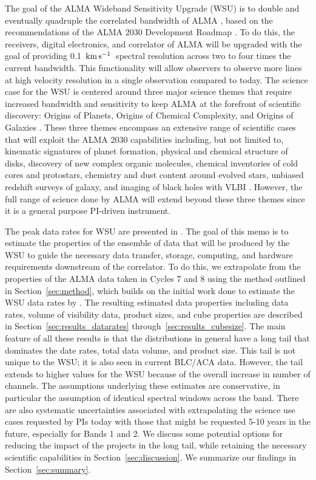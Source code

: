 \documentclass[preprint]{aastex631}
\newcommand{\kms}{\ensuremath{\rm{ km \, s^{-1}}}}
\begin{document}
The goal of the ALMA Wideband Sensitivity Upgrade (WSU) is to double and eventually quadruple the correlated bandwidth of ALMA \citep{Carpenter2022TheUpgrade}, based on the recommendations of the ALMA 2030 Development Roadmap \citep{Carpenter2018TheRoadmap}. To do this,  the receivers, digital electronics, and correlator of ALMA will be upgraded with the goal of providing 0.1~\kms\ spectral resolution across two to four times the current bandwidth. This functionality will allow observers to observe more lines at high velocity resolution in a single observation compared to today.  The science case for the WSU is centered around three major science themes that require increased bandwidth and sensitivity to keep ALMA at the forefront of scientific discovery: Origins of Planets, Origins of Chemical Complexity, and Origins of Galaxies \citep{Carpenter2018TheRoadmap}. These three themes encompass an extensive range of scientific cases that will exploit the ALMA 2030 capabilities including, but not limited to, kinematic signatures of planet formation, physical and chemical structure of disks, discovery of new complex organic molecules, chemical inventories of cold cores and protostars, chemistry and dust content around evolved stars, unbiased redshift surveys of galaxy, and imaging of black holes with VLBI \citep{Carpenter2018TheRoadmap}. However, the full range of science done by ALMA will extend beyond these three themes since it is a general purpose PI-driven instrument. 

The peak data rates for WSU are presented in \citet{Carpenter2023DataRates}. The goal of this memo is to estimate the properties of the ensemble of data that will be produced by the WSU to guide the necessary data transfer, storage, computing, and hardware requirements downstream of the correlator. To do this, we extrapolate from the properties of the ALMA data taken in Cycles 7 and 8 using the method outlined in Section~\ref{sec:method}, which builds on the initial work done to estimate the WSU data rates by \citet{Carpenter2022EstimatedUpgrade}. The resulting estimated data properties including data rates, volume of visibility data, product sizes, and cube properties are described in Section~\ref{sec:results_datarates} through~\ref{sec:results_cubesize}. The main feature of all these results is that the distributions in general have a long tail that dominates the date rates, total data volume, and product size. This tail is not unique to the WSU; it is also seen in current BLC/ACA data. However, the tail extends to higher values for the WSU because of the overall increase in number of channels. The assumptions underlying these estimates are conservative, in particular the assumption of identical spectral windows across the band. There are also systematic uncertainties associated with extrapolating the science use cases requested by PIs today with those that might be requested 5-10 years in the future, especially for Bands 1 and 2. We discuss some potential options for reducing the impact of the projects in the long tail, while retaining the necessary scientific capabilities in Section~\ref{sec:discussion}. We summarize our findings in Section~\ref{sec:summary}.
\end{document}
